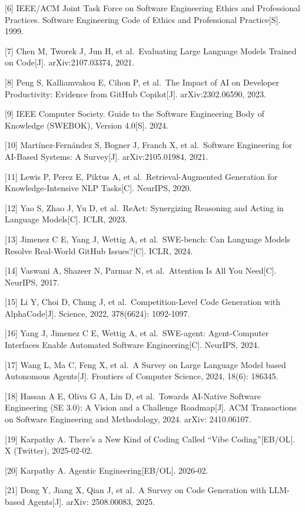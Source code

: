 \documentclass[12pt,a4paper,twoside,openany]{ctexbook}
\numberwithin{figure}{chapter}
\numberwithin{table}{chapter}
\begin{document}
{[}6{]} IEEE/ACM Joint Task Force on Software Engineering Ethics and
Professional Practices. Software Engineering Code of Ethics and
Professional Practice{[}S{]}. 1999.

{[}7{]} Chen M, Tworek J, Jun H, et al.~Evaluating Large Language Models
Trained on Code{[}J{]}. arXiv:2107.03374, 2021.

{[}8{]} Peng S, Kalliamvakou E, Cihon P, et al.~The Impact of AI on
Developer Productivity: Evidence from GitHub Copilot{[}J{]}.
arXiv:2302.06590, 2023.

{[}9{]} IEEE Computer Society. Guide to the Software Engineering Body of
Knowledge (SWEBOK), Version 4.0{[}S{]}. 2024.

{[}10{]} Martínez-Fernández S, Bogner J, Franch X, et al.~Software
Engineering for AI-Based Systems: A Survey{[}J{]}. arXiv:2105.01984,
2021.

{[}11{]} Lewis P, Perez E, Piktus A, et al.~Retrieval-Augmented
Generation for Knowledge-Intensive NLP Tasks{[}C{]}. NeurIPS, 2020.

{[}12{]} Yao S, Zhao J, Yu D, et al.~ReAct: Synergizing Reasoning and
Acting in Language Models{[}C{]}. ICLR, 2023.

{[}13{]} Jimenez C E, Yang J, Wettig A, et al.~SWE-bench: Can Language
Models Resolve Real-World GitHub Issues?{[}C{]}. ICLR, 2024.

{[}14{]} Vaswani A, Shazeer N, Parmar N, et al.~Attention Is All You
Need{[}C{]}. NeurIPS, 2017.

{[}15{]} Li Y, Choi D, Chung J, et al.~Competition-Level Code Generation
with AlphaCode{[}J{]}. Science, 2022, 378(6624): 1092-1097.

{[}16{]} Yang J, Jimenez C E, Wettig A, et al.~SWE-agent: Agent-Computer
Interfaces Enable Automated Software Engineering{[}C{]}. NeurIPS, 2024.

{[}17{]} Wang L, Ma C, Feng X, et al.~A Survey on Large Language Model
based Autonomous Agents{[}J{]}. Frontiers of Computer Science, 2024,
18(6): 186345.

{[}18{]} Hassan A E, Oliva G A, Lin D, et al.~Towards AI-Native Software
Engineering (SE 3.0): A Vision and a Challenge Roadmap{[}J{]}. ACM
Transactions on Software Engineering and Methodology, 2024. arXiv:
2410.06107.

{[}19{]} Karpathy A. There's a New Kind of Coding Called ``Vibe
Coding''{[}EB/OL{]}. X (Twitter), 2025-02-02.

{[}20{]} Karpathy A. Agentic Engineering{[}EB/OL{]}. 2026-02.

{[}21{]} Dong Y, Jiang X, Qian J, et al.~A Survey on Code Generation
with LLM-based Agents{[}J{]}. arXiv: 2508.00083, 2025.
\end{document}
